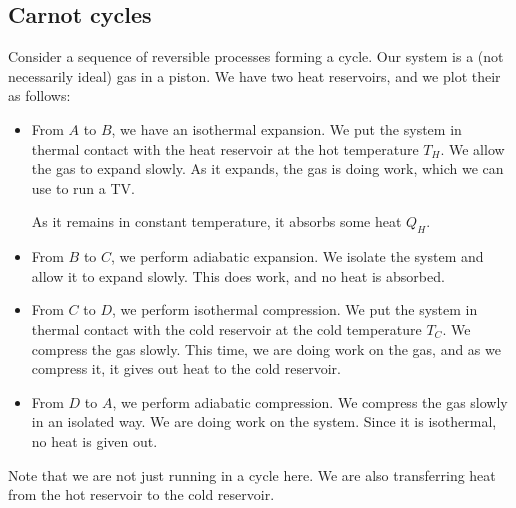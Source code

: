 \documentclass[a4paper]{article}
\begin{document}
\subsection{Carnot cycles}
Consider a sequence of reversible processes forming a cycle. Our system is a (not necessarily ideal) gas in a piston. We have two heat reservoirs, and we plot their  as follows:
\begin{center}
\end{center}
\begin{itemize}
  \item From $A$ to $B$, we have an isothermal expansion. We put the system in thermal contact with the heat reservoir at the hot temperature $T_H$. We allow the gas to expand slowly. As it expands, the gas is doing work, which we can use to run a TV.

    As it remains in constant temperature, it absorbs some heat $Q_H$.
  \item From $B$ to $C$, we perform adiabatic expansion. We isolate the system and allow it to expand slowly. This does work, and no heat is absorbed.
  \item From $C$ to $D$, we perform isothermal compression. We put the system in thermal contact with the cold reservoir at the cold temperature $T_C$. We compress the gas slowly. This time, we are doing work on the gas, and as we compress it, it gives out heat to the cold reservoir.
  \item From $D$ to $A$, we perform adiabatic compression. We compress the gas slowly in an isolated way. We are doing work on the system. Since it is isothermal, no heat is given out.
\end{itemize}
Note that we are not just running in a cycle here. We are also transferring heat from the hot reservoir to the cold reservoir.
\end{document}
